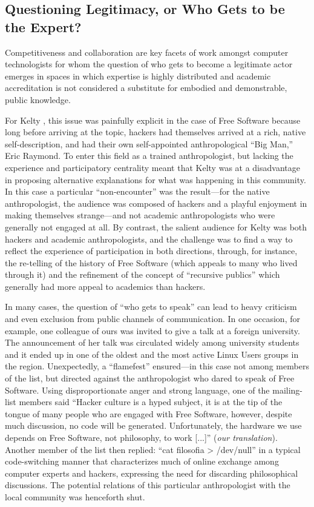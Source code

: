 \documentclass[10pt,letter,oneside]{scrartcl}
\begin{document}
\subsection*{Questioning Legitimacy, or Who Gets to be the Expert?}

Competitiveness and collaboration are key facets of work amongst
computer technologists for whom the question of who gets to become a
legitimate actor emerges in spaces in which expertise is highly
distributed and academic accreditation is not considered a substitute
for embodied and demonstrable, public knowledge.

For Kelty \cite{Kelty2008}, this issue was painfully explicit in the
case of Free Software because long before arriving at the topic,
hackers had themselves arrived at a rich, native self-description, and
had their own self-appointed anthropological ``Big Man,'' Eric Raymond.
To enter this field as a trained anthropologist, but lacking the
experience and participatory centrality meant that Kelty was at a
disadvantage in proposing alternative explanations for what was
happening in this community.  In this case a particular
``non-encounter'' was the result---for the native anthropologist, the
audience was composed of hackers and a playful enjoyment in making
themselves strange---and not academic anthropologists who were
generally not engaged at all.  By contrast, the salient audience for
Kelty was both hackers and academic anthropologists, and the challenge
was to find a way to reflect the experience of participation in both
directions, through, for instance, the re-telling of the history of
Free Software (which appeals to many who lived through it) and the
refinement of the concept of ``recursive publics'' which generally had
more appeal to academics than hackers.

In many cases, the question of ``who gets to speak'' can lead to heavy
criticism and even exclusion from public channels of communication.
In one occasion, for example, one colleague of ours was invited to
give a talk at a foreign university. The announcement of her talk was
circulated widely among university students and it ended up in one of
the oldest and the most active Linux Users groups in the region. 
Unexpectedly, a ``flamefest'' ensured---in this case not among members 
of the list, but directed against the anthropologist who dared to speak 
of Free Software. Using disproportionate anger and strong
language, one of the mailing-list members said ``Hacker culture is a
hyped subject, it is at the tip of the tongue of many people who are
engaged with Free Software, however, despite much discussion, no code
will be generated. Unfortunately, the hardware we use depends on Free
Software, not philosophy, to work {[}...{]}'' (\emph{our
  translation}). Another member of the list then replied: ``cat
filosofia \textgreater{} /dev/null'' in a typical code-switching
manner that characterizes much of online exchange among computer
experts and hackers, expressing the need for discarding philosophical
discussions.  The potential relations of this particular
anthropologist with the local community was henceforth shut.
\end{document}
